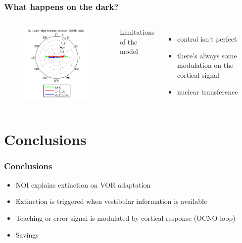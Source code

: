 \documentclass[10pt, compress]{beamer}
\begin{document}
\begin{frame}[fragile]
  \frametitle{What happens on the dark?}
  \begin{columns}[onlytextwidth]
      \begin{figure}
        \includegraphics[scale=0.6]{images/longnoi_11.png}
      \end{figure}
    Limitations of the model
    \begin{itemize}
      \item control isn't perfect
      \item there's always some modulation on the cortical signal
      \item nuclear transference
    \end{itemize}
  \end{columns}
\end{frame}

\section{Conclusions}

\begin{frame}[fragile]
  \frametitle{Conclusions}
  \begin{itemize}
    \item NOI explains extinction on VOR adaptation
    \item Extinction is triggered when vestibular information is available
    \item Teaching or error signal is modulated by cortical response (OCNO loop)
    \item Savings
  \end{itemize}
\end{frame}
\end{document}
